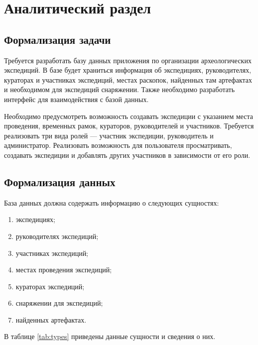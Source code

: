 \section{Аналитический раздел}

\subsection{Формализация задачи}

Требуется разработать базу данных приложения по организации археологических экспедиций. В базе будет храниться информация об экспедициях, руководителях, кураторах и участниках экспедиций, местах раскопок, найденных там артефактах и необходимом для экспедиций снаряжении. Также необходимо разработать интерфейс для взаимодействия с базой данных. 

Необходимо предусмотреть возможность создавать экспедиции с указанием
места проведения, временных рамок, кураторов, руководителей и участников. 
Требуется реализовать три вида ролей --- участник экспедиции, руководитель и администратор. Реализовать возможность для пользователя просматривать, создавать экспедиции и добавлять других участников в зависимости от его роли.

\subsection{Формализация данных}
База данных должна содержать информацию о следующих сущностях:

\begin{enumerate}[left=0.49cm, label*=---]
        \item экспедициях;
        \item руководителях экспедиций;
	\item участниках экспедиций;
	\item местах проведения экспедиций;
        \item кураторах экспедиций;
        \item снаряжении для экспедиций;
        \item найденных артефактах.
\end{enumerate}

В таблице \ref{tab:types} приведены данные сущности и сведения о них.
\newpage

